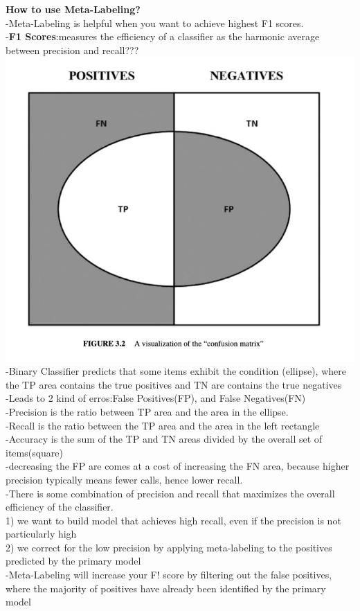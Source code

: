 \documentclass{article}
\begin{document}
\textbf{How to use Meta-Labeling?}\\ 
-Meta-Labeling is helpful when you want to achieve highest F1 scores.\\ 
		\indent-\textbf{F1 Scores}:measures the efficiency of a classifier as the harmonic average between precision and recall???\\ 
\includegraphics[width=\textwidth]{Confusion.png}\\ 
		\indent-Binary Classifier predicts that some items exhibit the condition (ellipse), 		 where the TP area contains the true positives and TN are contains the true negatives\\ 
        \indent-Leads to 2 kind of erros:False Positives(FP), and False Negatives(FN)\\ 
        \indent-Precision is the ratio between TP area and the area in the ellipse.\\ 
        -Recall is the ratio between the TP area and the area in the left rectangle\\ 
		\indent-Accuracy is the sum of the TP and TN areas divided by the overall set of
        items(square)\\ 
        \indent-decreasing the FP are comes at a cost of increasing the FN area, because 			higher precision typically means fewer calls, hence lower recall.\\ 
        \indent-There is some combination of precision and recall that maximizes the 
        overall efficiency of the classifier.\\ 
1) we want to build model that achieves high recall, even if the precision is not particularly high\\ 
2) we correct for the low precision by applying meta-labeling to the positives predicted by the primary model\\ 
	\indent-Meta-Labeling will increase your F! score by filtering out the false 					positives, where the majority of positives have already been identified by 	the primary model\\ 
    
\end{document}
